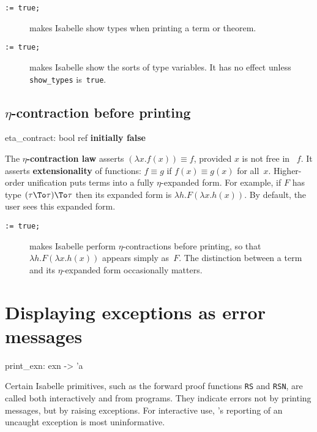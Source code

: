\begin{description}
\item[ \tt:= true;]
makes Isabelle show types when printing a term or theorem.

\item[ \tt:= true;]
makes Isabelle show the sorts of type variables.  It has no effect unless
{\tt show_types} is~{\tt true}. 
\end{description}


\subsection{$\eta$-contraction before printing}
\begin{ttbox} 
eta_contract: bool ref \hfill{\bf initially false}
\end{ttbox}
The {\bf $\eta$-contraction law} asserts $(\lambda x.f(x))\equiv f$,
provided $x$ is not free in ~$f$.  It asserts {\bf extensionality} of
functions: $f\equiv g$ if $f(x)\equiv g(x)$ for all~$x$.  Higher-order
unification puts terms into a fully $\eta$-expanded form.  For example, if
$F$ has type $(\tau\To\tau)\To\tau$ then its expanded form is $\lambda
h.F(\lambda x.h(x))$.  By default, the user sees this expanded form.

\begin{description}
\item[ \tt:= true;]
makes Isabelle perform $\eta$-contractions before printing, so that
$\lambda h.F(\lambda x.h(x))$ appears simply as~$F$.  The
distinction between a term and its $\eta$-expanded form occasionally
matters.
\end{description}


\section{Displaying exceptions as error messages}
\begin{ttbox} 
print_exn: exn -> 'a
\end{ttbox}
Certain Isabelle primitives, such as the forward proof functions {\tt RS}
and {\tt RSN}, are called both interactively and from programs.  They
indicate errors not by printing messages, but by raising exceptions.  For
interactive use, \ML's reporting of an uncaught exception is most
uninformative.

